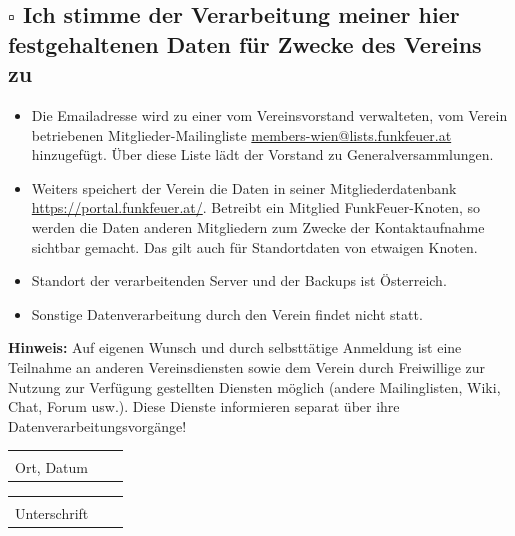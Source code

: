 \documentclass[parskip=half]{scrreprt}
\begin{document}
\subsection*{$\square$ Ich stimme der Verarbeitung meiner hier festgehaltenen Daten für Zwecke des Vereins zu}
\begin{itemize}
    \item Die Emailadresse wird zu einer vom Vereinsvorstand
        verwalteten, vom Verein betriebenen Mitglieder-Mailingliste
        \url{members-wien@lists.funkfeuer.at} hinzugefügt. Über diese
        Liste lädt der Vorstand zu Generalversammlungen.
    \item Weiters speichert der Verein die Daten in seiner
        Mitgliederdatenbank \url{https://portal.funkfeuer.at/}.
        Betreibt ein Mitglied FunkFeuer-Knoten, so werden die Daten
        anderen Mitgliedern zum Zwecke der Kontaktaufnahme sichtbar
        gemacht. Das gilt auch für Standortdaten von etwaigen Knoten.
    \item Standort der verarbeitenden Server und der Backups ist Österreich.
    \item Sonstige Datenverarbeitung durch den Verein findet nicht statt.
\end{itemize}

\textbf{Hinweis:} Auf eigenen Wunsch und durch selbsttätige Anmeldung ist eine
Teilnahme an anderen Vereinsdiensten sowie dem Verein durch Freiwillige
zur Nutzung zur Verfügung gestellten Diensten möglich (andere
Mailinglisten, Wiki, Chat, Forum usw.). Diese Dienste informieren
separat über ihre Datenverarbeitungsvorgänge!


\vspace{1.5cm}
\begin{tabular}{p{7cm}p{.5cm}l}
\dotfill \\
Ort, Datum
\end{tabular}
\hfill
\begin{tabular}{p{7cm}p{.5cm}l}
\dotfill \\
Unterschrift
\end{tabular}
\end{document}
